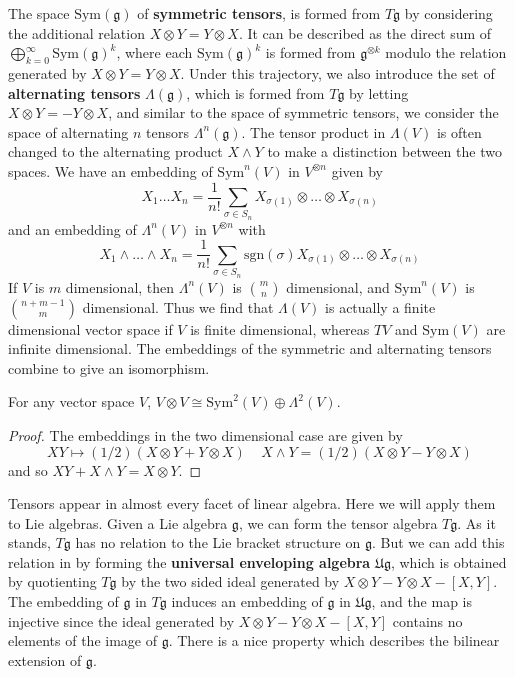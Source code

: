 The space $\text{Sym}(\mathfrak{g})$ of {\bf symmetric tensors}, is formed from $T\mathfrak{g}$ by considering the additional relation $X \otimes Y = Y \otimes X$. It can be described as the direct sum of $\bigoplus_{k = 0}^\infty \text{Sym}(\mathfrak{g})^k$, where each $\text{Sym}(\mathfrak{g})^k$ is formed from $\mathfrak{g}^{\otimes k}$ modulo the relation generated by $X \otimes Y = Y \otimes X$. Under this trajectory, we also introduce the set of {\bf alternating tensors} $\Lambda(\mathfrak{g})$, which is formed from $T\mathfrak{g}$ by letting $X \otimes Y = - Y \otimes X$, and similar to the space of symmetric tensors, we consider the space of alternating $n$ tensors $\Lambda^n(\mathfrak{g})$. The tensor product in $\Lambda(V)$ is often changed to the alternating product $X \wedge Y$ to make a distinction between the two spaces. We have an embedding of $\text{Sym}^n(V)$ in $V^{\otimes n}$ given by
%
\[ X_1 \dots X_n = \frac{1}{n!} \sum_{\sigma \in S_n} X_{\sigma(1)} \otimes \dots \otimes X_{\sigma(n)} \]
%
and an embedding of $\Lambda^n(V)$ in $V^{\otimes n}$ with
%
\[ X_1 \wedge \dots \wedge X_n = \frac{1}{n!} \sum_{\sigma \in S_n} \text{sgn}(\sigma) X_{\sigma(1)} \otimes \dots \otimes X_{\sigma(n)} \]
%
If $V$ is $m$ dimensional, then $\Lambda^n(V)$ is ${m \choose n}$ dimensional, and $\text{Sym}^n(V)$ is ${ n + m - 1 \choose m}$ dimensional. Thus we find that $\Lambda(V)$ is actually a finite dimensional vector space if $V$ is finite dimensional, whereas $TV$ and $\text{Sym}(V)$ are infinite dimensional. The embeddings of the symmetric and alternating tensors combine to give an isomorphism.

\begin{theorem}
    For any vector space $V$, $V \otimes V \cong \text{Sym}^2(V) \oplus \Lambda^2(V)$.
\end{theorem}
\begin{proof}
    The embeddings in the two dimensional case are given by
    \[ XY \mapsto (1/2)(X \otimes Y + Y \otimes X)\ \ \ \ \ X \wedge Y = (1/2)(X \otimes Y - Y \otimes X) \]
    and so $XY + X \wedge Y = X \otimes Y$.
\end{proof}

Tensors appear in almost every facet of linear algebra. Here we will apply them to Lie algebras. Given a Lie algebra $\mathfrak{g}$, we can form the tensor algebra $T\mathfrak{g}$. As it stands, $T\mathfrak{g}$ has no relation to the Lie bracket structure on $\mathfrak{g}$. But we can add this relation in by forming the {\bf universal enveloping algebra} $\mathfrak{U g}$, which is obtained by quotienting $T\mathfrak{g}$ by the two sided ideal generated by $X \otimes Y - Y \otimes X - [X,Y]$. The embedding of $\mathfrak{g}$ in $T\mathfrak{g}$ induces an embedding of $\mathfrak{g}$ in $\mathfrak{U g}$, and the map is injective since the ideal generated by $X \otimes Y - Y \otimes X - [X,Y]$ contains no elements of the image of $\mathfrak{g}$. There is a nice property which describes the bilinear extension of $\mathfrak{g}$.

